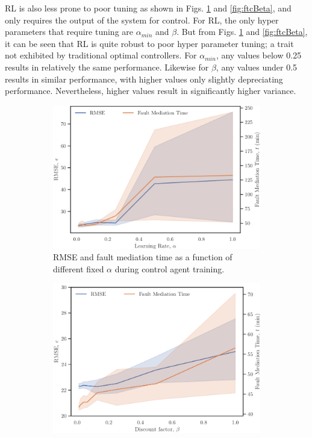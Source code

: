 RL is also less prone to poor tuning as shown in Figs. \ref{fig:ftcAlpha} and \ref{fig:ftcBeta}, and only requires the output of the system for control.  For RL, the only hyper parameters that require tuning are $\alpha_{min}$ and $\beta$.  But from Figs. \ref{fig:ftcAlpha} and \ref{fig:ftcBeta}, it can be seen that RL is quite robust to poor hyper parameter tuning; a trait not exhibited by traditional optimal controllers. For $\alpha_{min}$, any values below 0.25 results in relatively the same performance.  Likewise for $\beta$, any values under 0.5 results in similar performance, with higher values only slightly depreciating performance.  Nevertheless, higher values result in significantly higher variance.

\begin{figure}[H]
    \begin{center}
    \begin{subfigure}[b]{0.49\textwidth}
        \includegraphics[width=\textwidth]{images/ftc/ftcAlpha.pdf}
        \caption{{\scriptsize RMSE and fault mediation time as a function of different fixed $\alpha$ during control agent training.}}
        \label{fig:ftcAlpha}
    \end{subfigure}
    \hfill
    \begin{subfigure}[b]{0.49\textwidth}
        \includegraphics[width=\textwidth]{images/ftc/ftcBeta.pdf}

\end{subfigure}
\end{center}
\end{figure}
